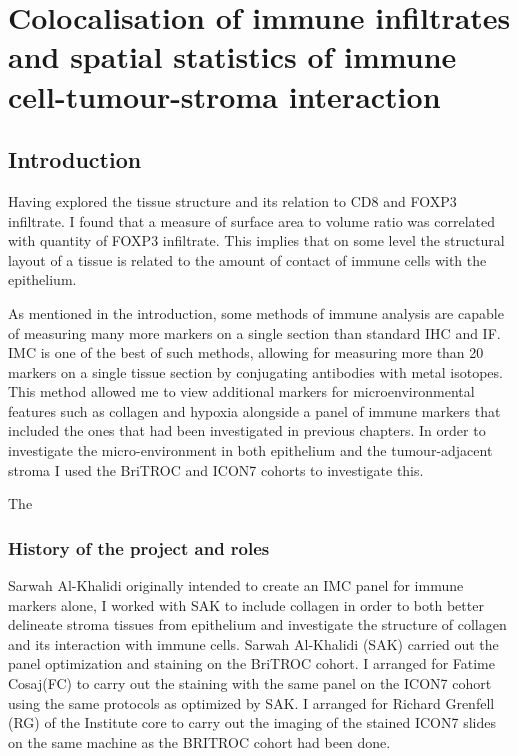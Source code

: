 
\chapter{Colocalisation of immune infiltrates and spatial statistics of immune cell-tumour-stroma interaction}

\ifpdf
    \graphicspath{{Chapter4/Figs/Raster/}{Chapter4/Figs/PDF/}{Chapter4/Figs/}}
\else
    \graphicspath{{Chapter4/Figs/Vector/}{Chapter4/Figs/}}
\fi


\section[Introduction]{Introduction}
Having explored the tissue structure and its relation to CD8 and FOXP3 infiltrate. I found that a measure of surface area to volume ratio was correlated with quantity of FOXP3 infiltrate. This implies that on some level the structural layout of a tissue is related to the amount of contact of immune cells with the epithelium.

As mentioned in the introduction, some methods of immune analysis are capable of measuring many more markers on a single section than standard IHC and IF. IMC is one of the best of such methods, allowing for measuring more than 20 markers on a single tissue section by conjugating antibodies with metal isotopes. This method allowed me to view additional markers for microenvironmental features such as collagen and hypoxia alongside a panel of immune markers that included the ones that had been investigated in previous chapters. In order to investigate the micro-environment in both epithelium and the tumour-adjacent stroma I used the BriTROC and ICON7 cohorts to investigate this.

The 

\subsection{History of the project and roles}
Sarwah Al-Khalidi originally intended to create an IMC panel for immune markers alone, I worked with SAK to include collagen in order to both better delineate stroma tissues from epithelium and investigate the structure of collagen and its interaction with immune cells. Sarwah Al-Khalidi (SAK) carried out the panel optimization and staining on the BriTROC cohort. I arranged for Fatime Cosaj(FC) to carry out the staining with the same panel on the ICON7 cohort using the same protocols as optimized by SAK. I arranged for Richard Grenfell (RG) of the Institute core to carry out the imaging of the stained ICON7 slides on the same machine as the BRITROC cohort had been done.

